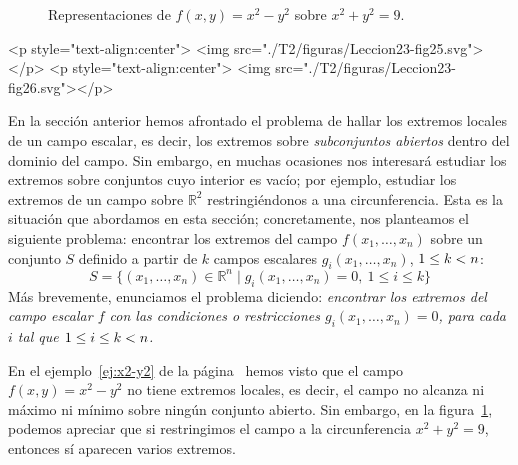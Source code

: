 \begin{figure}[t]
\begin{center}
\end{center}
\caption{Representaciones de $f(x,y)=x^2-y^2$ sobre $x^2+y^2=9$.}\label{fig:lagrange1}
\end{figure}
\begin{rawhtml}
<p style="text-align:center">
    <img src="./T2/figuras/Leccion23-fig25.svg"></p>
<p style="text-align:center">
    <img src="./T2/figuras/Leccion23-fig26.svg"></p>
\end{rawhtml}


En la sección anterior hemos afrontado el problema de hallar los extremos locales de un campo
escalar, es decir, los extremos sobre \emph{subconjuntos abiertos} dentro del dominio del campo.
Sin embargo, en muchas ocasiones nos interesará estudiar los extremos sobre conjuntos cuyo interior es vacío;
por ejemplo, estudiar los extremos de un campo sobre $\mathbb{R}^2$ restringiéndonos a una circunferencia.
Esta es la situación que abordamos en esta sección;
concretamente, nos planteamos el siguiente problema:
encontrar los extremos del campo $f(x_1,\dots,x_n)$ sobre un conjunto $S$ definido a partir de $k$ campos escalares $g_i(x_1,\dots,x_n)$,  $1\le k<  n$:
\[
S=\{(x_1,\dots,x_n)\in\mathbb{R}^n\mid g_i(x_1,\dots,x_n)=0,\ 1\le i\le k\}
\]
Más brevemente, enunciamos el problema diciendo:
\emph{encontrar los extremos del campo escalar $f$ con las condiciones o restricciones
$g_i(x_1,\dots,x_n)=0$, para cada $i$ tal que $1\leq i\leq k<  n$.}

En el ejemplo~\ref{ej:x2-y2} de la página~\pageref{ej:x2-y2} hemos visto que el campo $f(x,y)=x^2-y^2$ no tiene extremos locales, es decir, el campo no alcanza ni máximo ni mínimo sobre ningún conjunto abierto.
Sin embargo, en la figura~\ref{fig:lagrange1}, podemos apreciar que si restringimos el campo a la circunferencia $x^2+y^2=9$, entonces sí aparecen varios extremos.

